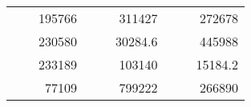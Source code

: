 \begin{table}[H]
\begin{tabular}{|ccrccrccc}
\rowcolor[HTML]{DAE8FC} 
\multicolumn{1}{|c|}{\cellcolor[HTML]{FFFFC7}}                                & \multicolumn{1}{c|}{\cellcolor[HTML]{DAE8FC}}                      & \multicolumn{1}{r|}{\cellcolor[HTML]{DAE8FC}195766}    & \multicolumn{1}{c|}{\cellcolor[HTML]{FFFFC7}}                                & \multicolumn{1}{c|}{\cellcolor[HTML]{DAE8FC}}                       & \multicolumn{1}{r|}{\cellcolor[HTML]{DAE8FC}311427}    & \multicolumn{1}{c|}{\cellcolor[HTML]{FFFFC7}}                                & \multicolumn{1}{c|}{\cellcolor[HTML]{DAE8FC}}                      & \multicolumn{1}{r|}{\cellcolor[HTML]{DAE8FC}272678}    \\ \cline{3-3} \cline{6-6} \cline{9-9} 
\multicolumn{1}{|c|}{\cellcolor[HTML]{FFFFC7}}                                & \multicolumn{1}{c|}{\cellcolor[HTML]{DAE8FC}}                      & \multicolumn{1}{r|}{\cellcolor[HTML]{DDFDFF}230580}    & \multicolumn{1}{c|}{\cellcolor[HTML]{FFFFC7}}                                & \multicolumn{1}{c|}{\cellcolor[HTML]{DAE8FC}}                       & \multicolumn{1}{r|}{\cellcolor[HTML]{DDFDFF}30284.6}   & \multicolumn{1}{c|}{\cellcolor[HTML]{FFFFC7}}                                & \multicolumn{1}{c|}{\cellcolor[HTML]{DAE8FC}}                      & \multicolumn{1}{r|}{\cellcolor[HTML]{DDFDFF}445988}    \\ \cline{3-3} \cline{6-6} \cline{9-9} 
\rowcolor[HTML]{DAE8FC} 
\multicolumn{1}{|c|}{\cellcolor[HTML]{FFFFC7}}                                & \multicolumn{1}{c|}{\cellcolor[HTML]{DAE8FC}}                      & \multicolumn{1}{r|}{\cellcolor[HTML]{DAE8FC}233189}    & \multicolumn{1}{c|}{\cellcolor[HTML]{FFFFC7}}                                & \multicolumn{1}{c|}{\cellcolor[HTML]{DAE8FC}}                       & \multicolumn{1}{r|}{\cellcolor[HTML]{DAE8FC}103140}    & \multicolumn{1}{c|}{\cellcolor[HTML]{FFFFC7}}                                & \multicolumn{1}{c|}{\cellcolor[HTML]{DAE8FC}}                      & \multicolumn{1}{r|}{\cellcolor[HTML]{DAE8FC}15184.2}   \\ \cline{3-3} \cline{6-6} \cline{9-9} 
\multicolumn{1}{|c|}{\cellcolor[HTML]{FFFFC7}}                                & \multicolumn{1}{c|}{\cellcolor[HTML]{DAE8FC}}                      & \multicolumn{1}{r|}{\cellcolor[HTML]{DDFDFF}77109}     & \multicolumn{1}{c|}{\cellcolor[HTML]{FFFFC7}}                                & \multicolumn{1}{c|}{\cellcolor[HTML]{DAE8FC}}                       & \multicolumn{1}{r|}{\cellcolor[HTML]{DDFDFF}799222}    & \multicolumn{1}{c|}{\cellcolor[HTML]{FFFFC7}}                                & \multicolumn{1}{c|}{\cellcolor[HTML]{DAE8FC}}                      & \multicolumn{1}{r|}{\cellcolor[HTML]{DDFDFF}266890}    \\ \cline{3-3} \cline{6-6} \cline{9-9} 

\end{tabular}
\end{table}
